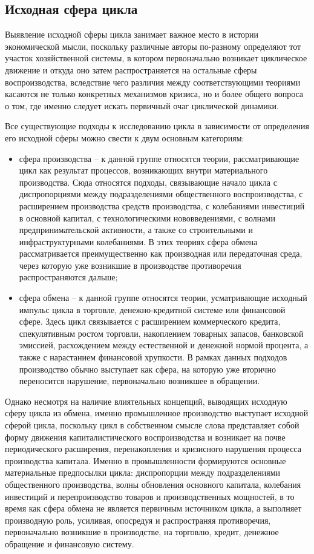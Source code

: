 \subsection{Исходная сфера цикла} %
Выявление исходной сферы цикла занимает важное место в истории экономической мысли, поскольку различные авторы по-разному определяют тот участок хозяйственной системы, в котором первоначально возникает циклическое движение и откуда оно затем распространяется на остальные сферы воспроизводства, вследствие чего различия между соответствующими теориями касаются не только конкретных механизмов кризиса, но и более общего вопроса о том, где именно следует искать первичный очаг циклической динамики.

Все существующие подходы к исследованию цикла в зависимости от определения его исходной сферы можно свести к двум основным категориям:
\begin{itemize}
    \item сфера производства – к данной группе относятся теории, рассматривающие цикл как результат процессов, возникающих внутри материального производства. Сюда относятся подходы, связывающие начало цикла с диспропорциями между подразделениями общественного воспроизводства, с расширением производства средств производства, с колебаниями инвестиций в основной капитал, с технологическими нововведениями, с волнами предпринимательской активности, а также со строительными и инфраструктурными колебаниями. В этих теориях сфера обмена рассматривается преимущественно как производная или передаточная среда, через которую уже возникшие в производстве противоречия распространяются дальше;
    \item сфера обмена – к данной группе относятся теории, усматривающие исходный импульс цикла в торговле, денежно-кредитной системе или финансовой сфере. Здесь цикл связывается с расширением коммерческого кредита, спекулятивным ростом торговли, накоплением товарных запасов, банковской эмиссией, расхождением между естественной и денежной нормой процента, а также с нарастанием финансовой хрупкости. В рамках данных подходов производство обычно выступает как сфера, на которую уже вторично переносится нарушение, первоначально возникшее в обращении.
\end{itemize}

Однако несмотря на наличие влиятельных концепций, выводящих исходную сферу цикла из обмена, именно промышленное производство выступает исходной сферой цикла, поскольку цикл в собственном смысле слова представляет собой форму движения капиталистического воспроизводства и возникает на почве периодического расширения, перенакопления и кризисного нарушения процесса производства капитала. Именно в промышленности формируются основные материальные предпосылки цикла: диспропорции между подразделениями общественного производства, волны обновления основного капитала, колебания инвестиций и перепроизводство товаров и производственных мощностей, в то время как сфера обмена не является первичным источником цикла, а выполняет производную роль, усиливая, опосредуя и распространяя противоречия, первоначально возникшие в производстве, на торговлю, кредит, денежное обращение и финансовую систему.


